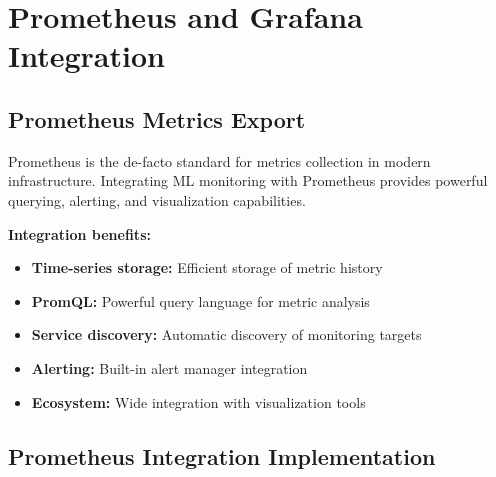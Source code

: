 \section{Prometheus and Grafana Integration}

\subsection{Prometheus Metrics Export}

Prometheus is the de-facto standard for metrics collection in modern infrastructure. Integrating ML monitoring with Prometheus provides powerful querying, alerting, and visualization capabilities.

\textbf{Integration benefits:}
\begin{itemize}
    \item \textbf{Time-series storage:} Efficient storage of metric history
    \item \textbf{PromQL:} Powerful query language for metric analysis
    \item \textbf{Service discovery:} Automatic discovery of monitoring targets
    \item \textbf{Alerting:} Built-in alert manager integration
    \item \textbf{Ecosystem:} Wide integration with visualization tools
\end{itemize}

\subsection{Prometheus Integration Implementation}

